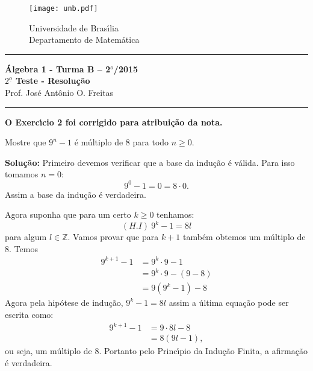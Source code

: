 \documentclass[12pt]{article}
\newcounter{exercicios}
\newcommand{\questao}{
\addtocounter{exercicios}{1}
\noindent{\bf Exerc{\'\i}cio \arabic{exercicios}: }}
\newcommand{\z}{\mathbb{Z}}
\begin{document}
\pagestyle{empty}

\begin{figure}[h]
        \begin{minipage}[c]{1.7cm}
        \texttt{[image: unb.pdf]}
        \end{minipage}%
        \hspace{0pt}
        \begin{minipage}[c]{4in}
          {Universidade de Bras{\'\i}lia} \\
          {Departamento de Matem{\'a}tica}
\end{minipage}
\end{figure}
\vspace{-1cm}\hrule

\begin{center}
{\Large\bf {\'A}lgebra 1 - Turma B -- 2$^{o}$/2015} \\ \vspace{9pt} {\large\bf
  $2^{\underline{o}}$ Teste - Resolu\c{c}\~ao}\\
\vspace{9pt} Prof. Jos{\'e} Ant{\^o}nio O. Freitas
\end{center}
\hrule

\vspace{.6cm}

\textbf{O Exerc{\'\i}cio 2 foi corrigido para atribui\c{c}\~ao da nota.}

\vspace{.6cm}

\questao Mostre que $9^n - 1$ {\'e} m\'ultiplo de 8 para todo $n \ge 0$.

\noindent\textbf{Solu\c{c}\~ao:} Primeiro devemos verificar que a base da indu\c{c}\~ao \'e v\'alida. Para isso tomamos $n = 0$:
\[
	9^0 - 1 = 0 = 8\cdot 0.
\]
Assim a base da indu\c{c}\~ao \'e verdadeira.

Agora suponha que para um certo $k \ge 0$ tenhamos:
\[
	(H.I)\ 9^k - 1 = 8l
\]
para algum $l \in \z$. Vamos provar que para $k + 1$ tamb\'em obtemos um m\'ultiplo de 8. Temos
\begin{align*}
	9^{k + 1} - 1 &= 9^k\cdot 9 - 1 \\& = 9^k\cdot 9 - (9 - 8) \\ &= 9(9^k - 1) - 8
\end{align*}
Agora pela hip\'otese de indu\c{c}\~ao, $9^k - 1 = 8l$ assim a \'ultima equa\c{c}\~ao pode ser escrita como:
\begin{align*}
	9^{k + 1} - 1 &= 9\cdot 8l - 8 \\ &= 8(9l - 1),
\end{align*}
ou seja, um m\'ultiplo de 8. Portanto pelo Princ{\'\i}pio da Indu\c{c}\~ao Finita, a afirma\c{c}\~ao \'e verdadeira.
\end{document}
